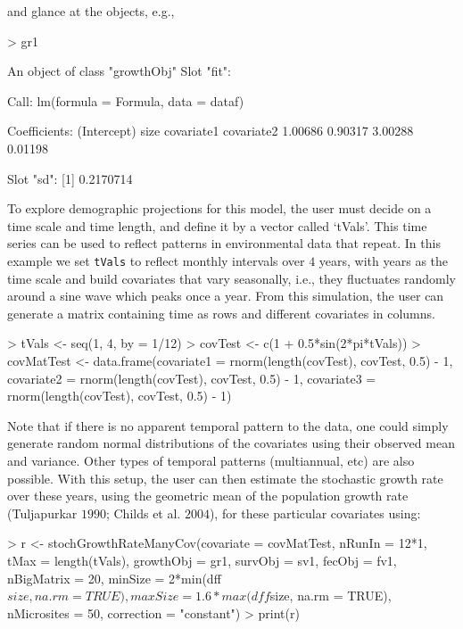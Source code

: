 \documentclass{article}
\begin{document}
and glance at the objects, e.g., 
\begin{Schunk}
\begin{Sinput}
> gr1
\end{Sinput}
\begin{Soutput}
An object of class "growthObj"
Slot "fit":

Call:
lm(formula = Formula, data = dataf)

Coefficients:
(Intercept)         size   covariate1   covariate2  
    1.00686      0.90317      3.00288      0.01198  


Slot "sd":
[1] 0.2170714
\end{Soutput}
\end{Schunk}
To explore demographic projections for this model, the user must decide on
a time scale and time length, and define it by a vector called
`tVals'.  This time series can be used to reflect patterns in environmental data
that repeat.  In this example we set {\tt tVals} to reflect monthly intervals
over $4$ years, with years as the time scale and build covariates that vary
seasonally, i.e., they fluctuates randomly around a sine wave which peaks once a
year.  From this simulation, the user can generate a matrix containing time as
rows and different covariates in columns.
\begin{Schunk}
\begin{Sinput}
> tVals <- seq(1, 4, by = 1/12)
> covTest <- c(1 + 0.5*sin(2*pi*tVals))
> covMatTest <- data.frame(covariate1 = rnorm(length(covTest), covTest, 0.5) - 1, 
                           covariate2 = rnorm(length(covTest), covTest, 0.5) - 1, 
                           covariate3 = rnorm(length(covTest), covTest, 0.5) - 1)
\end{Sinput}
\end{Schunk}
Note that  if there is no apparent temporal pattern to the data, one could
simply generate random normal distributions of the covariates using their observed mean and variance. Other types of temporal patterns (multiannual, etc) are also possible. With this setup, the user can then estimate the stochastic growth rate over these years, using the geometric mean of the population growth rate (Tuljapurkar $1990$; Childs et al. $2004$), for these particular covariates using:
\begin{Schunk}
\begin{Sinput}
> r <- stochGrowthRateManyCov(covariate = covMatTest, nRunIn = 12*1, 
                              tMax = length(tVals), growthObj = gr1, 
                              survObj = sv1, fecObj = fv1, nBigMatrix = 20, 
                              minSize = 2*min(dff$size, na.rm = TRUE), 
                              maxSize = 1.6*max(dff$size, na.rm = TRUE), 
                              nMicrosites = 50, correction = "constant")
> print(r)
\end{Sinput}
\end{Schunk}
\end{document}
